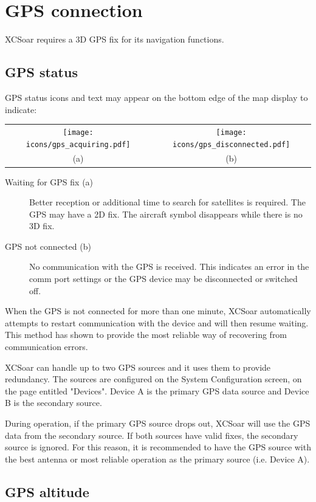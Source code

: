 \section{GPS connection}

XCSoar requires a 3D GPS fix for its navigation functions.

\subsection*{GPS status}

GPS status icons and text may appear on the bottom edge of the
map display to indicate:

\begin{tabular}{c c}%
\texttt{[image: icons/gps\_acquiring.pdf]} & \texttt{[image: icons/gps\_disconnected.pdf]}\\
(a) & (b)
\end{tabular}

\begin{description}
\item[Waiting for GPS fix (a)]  Better reception
  or additional time to search for satellites is required. The GPS may have a 2D fix.
  The aircraft symbol disappears while there is no 3D fix.
\item[GPS not connected (b)]  No communication with the GPS is received.
  This indicates an error in the comm port settings or the GPS device may
  be disconnected or switched off.
\end{description}

When the GPS is not connected for more than one minute, XCSoar automatically
attempts to restart communication with the device and will then resume waiting.
This method has shown to provide the most reliable way of recovering from
communication errors.

XCSoar can handle up to two GPS sources and it uses them to provide redundancy.
The sources are configured on the System Configuration screen, on the page
entitled "Devices".  Device A is the primary GPS data source and Device B is
the secondary source.

During operation, if the primary GPS source drops out, XCSoar will use the GPS
data from the secondary source.  If both sources have valid fixes, the secondary
source is ignored.  For this reason, it is recommended to have the GPS source
with the best antenna or most reliable operation as the primary source (i.e. Device A).

\subsection*{GPS altitude}

